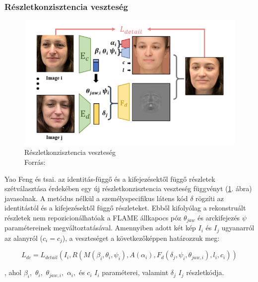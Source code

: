 \documentclass[12pt,a4]{article}
\begin{document}
            \subsubsection{Részletkonzisztencia veszteség}
    	 
        	    \begin{figure}[h]	
        	 	     \centering
        	 	     \includegraphics[width=1\linewidth]{ldetail}
        	 	     \caption{Részletkonzisztencia veszteség \\
        	 		    Forrás: \cite{deca}}
                  \label{fig:ldetail}
    	        \end{figure}
    
                Yao Feng és tsai. az identitás-függő és a kifejezésektől függő részletek
     	        szétválasztása érdekében egy új részletkonzisztencia veszteség függvényt (\ref{fig:ldetail}. ábra)
     	        javasolnak. A metódus nélkül a személyspecifikus látens kód $\delta$ rögzíti az
                identitástól és a kifejezésektől függő részleteket. 
                Ebből kifolyólag a rekonstruált részletek nem repozicionálhatóak a FLAME állkapocs póz $\theta_{jaw}$ és arckifejezés $\psi$ paramétereinek megváltoztatásával. Amennyiben adott két kép $I_{i}$ és $I_{j}$ ugyanarról az alanyról ($c_{i} = c_{j}$), a veszteséget a következőképpen határozzuk meg:
        
                \begin{equation*}
                L_{dc} = L_{detail}(I_{i}, R(M (\beta_{i}, \theta_{i}, \psi_{i}), A(\alpha_{i}), F_{d}(\delta_{j} , \psi_{i}, \theta_{jaw,i}), l_{i}, c_{i}))
                \end{equation*}
            
         	      , ahol $\beta_{i},$ $\theta_{i},$ $\theta_{jaw,i},$ $\alpha_{i},$ és 
                $c_{i}$ $I_{i}$ paraméterei, valamint $\delta_{j}$ $I_{j}$ részletkódja.
\end{document}
